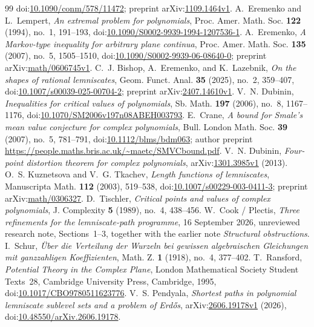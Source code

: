 \documentclass[11pt]{article}
\begin{document}
\begin{thebibliography}{99}
  doi:\href{https://doi.org/10.1090/conm/578/11472}{10.1090/conm/578/11472};
  preprint arXiv:\href{https://arxiv.org/abs/1109.1464v1}{1109.1464v1}.
 A.~Eremenko and L.~Lempert,
  \emph{An extremal problem for polynomials}, Proc. Amer. Math. Soc.
  \textbf{122} (1994), no.~1, 191--193,
  doi:\href{https://doi.org/10.1090/S0002-9939-1994-1207536-1}
  {10.1090/S0002-9939-1994-1207536-1}.
 A.~Eremenko,
  \emph{A Markov-type inequality for arbitrary plane continua},
  Proc. Amer. Math. Soc. \textbf{135} (2007), no.~5, 1505--1510,
  doi:\href{https://doi.org/10.1090/S0002-9939-06-08640-0}
  {10.1090/S0002-9939-06-08640-0};
  preprint arXiv:\href{https://arxiv.org/abs/math/0606745v1}{math/0606745v1}.
 C.~J. Bishop, A.~Eremenko, and
  K.~Lazebnik, \emph{On the shapes of rational lemniscates}, Geom. Funct.
  Anal. \textbf{35} (2025), no.~2, 359--407,
  doi:\href{https://doi.org/10.1007/s00039-025-00704-2}
  {10.1007/s00039-025-00704-2};
  preprint arXiv:\href{https://arxiv.org/abs/2407.14610v1}{2407.14610v1}.
 V.~N. Dubinin,
  \emph{Inequalities for critical values of polynomials}, Sb. Math.
  \textbf{197} (2006), no.~8, 1167--1176,
  doi:\href{https://doi.org/10.1070/SM2006v197n08ABEH003793}{10.1070/SM2006v197n08ABEH003793}.
 E.~Crane,
  \emph{A bound for Smale's mean value conjecture for complex polynomials},
  Bull. London Math. Soc. \textbf{39} (2007), no.~5, 781--791,
  doi:\href{https://doi.org/10.1112/blms/bdm063}{10.1112/blms/bdm063};
  author preprint \url{https://people.maths.bris.ac.uk/~maetc/SMVCbound.pdf}.
 V.~N. Dubinin,
  \emph{Four-point distortion theorem for complex polynomials},
  arXiv:\href{https://arxiv.org/abs/1301.3985v1}{1301.3985v1} (2013).
 O.~S. Kuznetsova and V.~G. Tkachev,
  \emph{Length functions of lemniscates}, Manuscripta Math.
  \textbf{112} (2003), 519--538,
  doi:\href{https://doi.org/10.1007/s00229-003-0411-3}{10.1007/s00229-003-0411-3};
  preprint arXiv:\href{https://arxiv.org/abs/math/0306327}{math/0306327}.
 D.~Tischler,
  \emph{Critical points and values of complex polynomials},
  J. Complexity \textbf{5} (1989), no.~4, 438--456.
 W.~Cook / Plectis,
  \emph{Three refinements for the lemniscate-path programme}, 16 September 2026,
  unreviewed research note, Sections~1--3, together with the earlier
  note \emph{Structural obstructions}.
 I.~Schur,
  \emph{\"Uber die Verteilung der Wurzeln bei gewissen algebraischen
  Gleichungen mit ganzzahligen Koeffizienten}, Math. Z. \textbf{1}
  (1918), no.~4, 377--402.
 T.~Ransford,
  \emph{Potential Theory in the Complex Plane}, London Mathematical Society
  Student Texts~28, Cambridge University Press, Cambridge, 1995,
  doi:\href{https://doi.org/10.1017/CBO9780511623776}{10.1017/CBO9780511623776}.
 V.~S. Pendyala,
  \emph{Shortest paths in polynomial lemniscate sublevel sets and a problem
  of Erd\H{o}s}, arXiv:\href{https://arxiv.org/abs/2606.19178v1}{2606.19178v1}
  (2026),
  doi:\href{https://doi.org/10.48550/arXiv.2606.19178}
  {10.48550/arXiv.2606.19178}.
\end{thebibliography}
\end{document}

